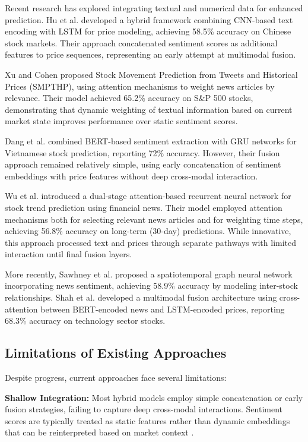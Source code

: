 \documentclass[conference]{IEEEtran}
\begin{document}
Recent research has explored integrating textual and numerical data for enhanced prediction. Hu et al. \cite{hu2018listening} developed a hybrid framework combining CNN-based text encoding with LSTM for price modeling, achieving 58.5\% accuracy on Chinese stock markets. Their approach concatenated sentiment scores as additional features to price sequences, representing an early attempt at multimodal fusion.

Xu and Cohen \cite{xu2018stock} proposed Stock Movement Prediction from Tweets and Historical Prices (SMPTHP), using attention mechanisms to weight news articles by relevance. Their model achieved 65.2\% accuracy on S\&P 500 stocks, demonstrating that dynamic weighting of textual information based on current market state improves performance over static sentiment scores.

Dang et al. \cite{dang2020sentiment} combined BERT-based sentiment extraction with GRU networks for Vietnamese stock prediction, reporting 72\% accuracy. However, their fusion approach remained relatively simple, using early concatenation of sentiment embeddings with price features without deep cross-modal interaction.

Wu et al. \cite{wu2020deep} introduced a dual-stage attention-based recurrent neural network for stock trend prediction using financial news. Their model employed attention mechanisms both for selecting relevant news articles and for weighting time steps, achieving 56.8\% accuracy on long-term (30-day) predictions. While innovative, this approach processed text and prices through separate pathways with limited interaction until final fusion layers.

More recently, Sawhney et al. \cite{sawhney2020spatiotemporal} proposed a spatiotemporal graph neural network incorporating news sentiment, achieving 58.9\% accuracy by modeling inter-stock relationships. Shah et al. \cite{shah2022stock} developed a multimodal fusion architecture using cross-attention between BERT-encoded news and LSTM-encoded prices, reporting 68.3\% accuracy on technology sector stocks.

\subsection{Limitations of Existing Approaches}

Despite progress, current approaches face several limitations:

\textbf{Shallow Integration:} Most hybrid models employ simple concatenation or early fusion strategies, failing to capture deep cross-modal interactions. Sentiment scores are typically treated as static features rather than dynamic embeddings that can be reinterpreted based on market context \cite{xu2018stock, dang2020sentiment}.
\end{document}
